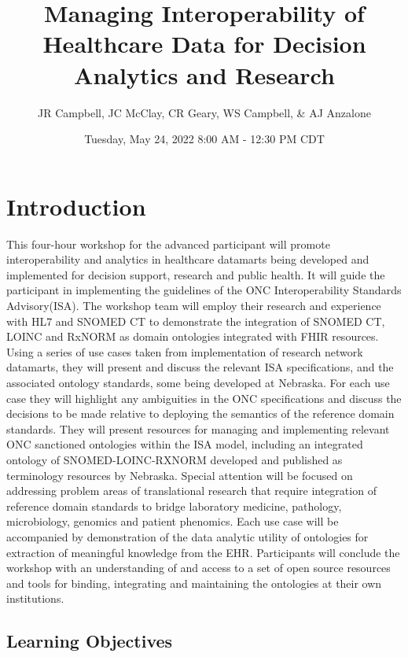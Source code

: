 \documentclass[
]{journal}
\title{Managing Interoperability of Healthcare Data for Decision Analytics and Research}
\author{JR Campbell, JC McClay, CR Geary, WS Campbell, \& AJ Anzalone}
\date{Tuesday, May 24, 2022 8:00 AM - 12:30 PM CDT}
\begin{document}
\maketitle

{
\setcounter{tocdepth}{2}
\tableofcontents
}
\hypertarget{introduction}{%
\section{Introduction}\label{introduction}}

This four-hour workshop for the advanced participant will promote interoperability and analytics in healthcare datamarts being developed and implemented for decision support, research and public health. It will guide the participant in implementing the guidelines of the ONC Interoperability Standards Advisory(ISA). The workshop team will employ their research and experience with HL7 and SNOMED CT to demonstrate the integration of SNOMED CT, LOINC and RxNORM as domain ontologies integrated with FHIR resources. Using a series of use cases taken from implementation of research network datamarts, they will present and discuss the relevant ISA specifications, and the associated ontology standards, some being developed at Nebraska. For each use case they will highlight any ambiguities in the ONC specifications and discuss the decisions to be made relative to deploying the semantics of the reference domain standards. They will present resources for managing and implementing relevant ONC sanctioned ontologies within the ISA model, including an integrated ontology of SNOMED-LOINC-RXNORM developed and published as terminology resources by Nebraska. Special attention will be focused on addressing problem areas of translational research that require integration of reference domain standards to bridge laboratory medicine, pathology, microbiology, genomics and patient phenomics. Each use case will be accompanied by demonstration of the data analytic utility of ontologies for extraction of meaningful knowledge from the EHR. Participants will conclude the workshop with an understanding of and access to a set of open source resources and tools for binding, integrating and maintaining the ontologies at their own institutions.

\hypertarget{learning-objectives}{%
\subsection{Learning Objectives}\label{learning-objectives}}
\end{document}
